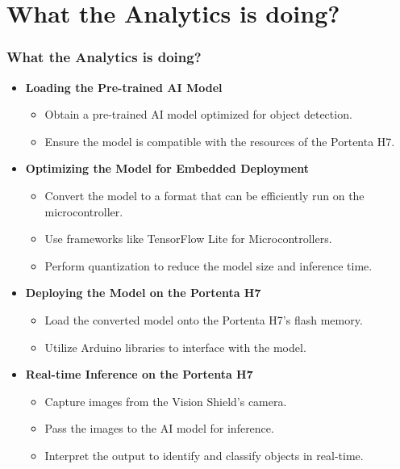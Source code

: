 \documentclass[10pt, a4paper]{beamer}
\begin{document}
	
	\section{What the Analytics is doing?}
	\begin{frame}
		\frametitle{What the Analytics is doing?}
		
		\begin{itemize}
			\item \textbf{Loading the Pre-trained AI Model}
			\begin{itemize}
				\item Obtain a pre-trained AI model optimized for object detection.
				\item Ensure the model is compatible with the resources of the Portenta H7.
			\end{itemize}
			\vspace{0.3cm}
			
			\item \textbf{Optimizing the Model for Embedded Deployment}
			\begin{itemize}
				\item Convert the model to a format that can be efficiently run on the microcontroller.
				\item Use frameworks like TensorFlow Lite for Microcontrollers.
				\item Perform quantization to reduce the model size and inference time.
			\end{itemize}
			\vspace{0.3cm}
			
			\item \textbf{Deploying the Model on the Portenta H7}
			\begin{itemize}
				\item Load the converted model onto the Portenta H7's flash memory.
				\item Utilize Arduino libraries to interface with the model.
			\end{itemize}
			\vspace{0.3cm}
			
			\item \textbf{Real-time Inference on the Portenta H7}
			\begin{itemize}
				\item Capture images from the Vision Shield's camera.
				\item Pass the images to the AI model for inference.
				\item Interpret the output to identify and classify objects in real-time.
			\end{itemize}
		\end{itemize}
	\end{frame}
	
\end{document}
